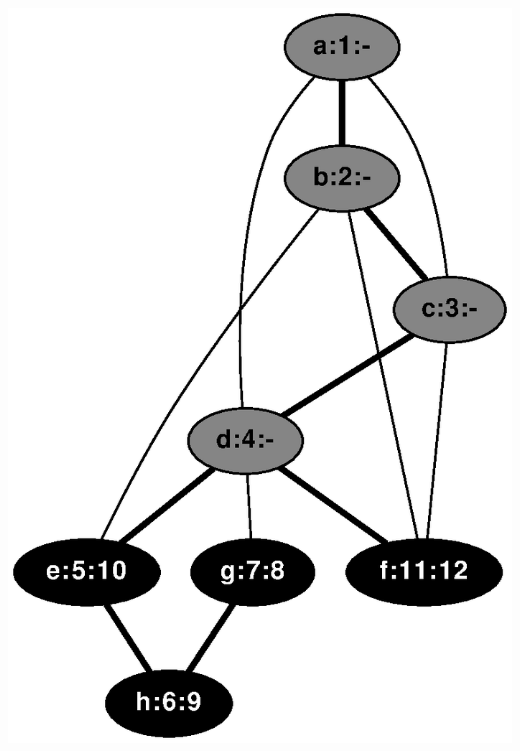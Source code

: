 \documentclass{article}
\begin{document}
\includegraphics[height=.3\textheight]{dfs_undirected_classroom_12.eps}
\vspace{1em}
\end{document}
